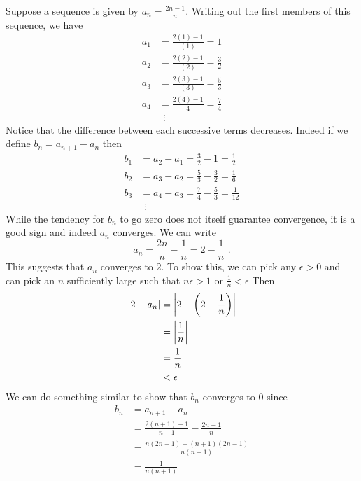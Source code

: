 \begin{example}
    Suppose a sequence is given by \( a_{n} = \frac{2n-1}{n} \). Writing out the first members of this sequence, we have 
    \begin{align*}
        a_{1} &= \frac{2(1)-1}{\left( 1 \right)} = 1 \\
        a_{2} &= \frac{2(2)-1}{(2)} = \frac{3}{2} \\
        a_{3} &= \frac{2(3)-1}{(3)} = \frac{5}{3} \\
        a_{4} &= \frac{2(4)-1}{4} = \frac{7}{4} \\
        & \ \ \vdots
    \end{align*}
    Notice that the difference between each successive terms decreases. Indeed if we define \( b_{n} = a_{n+1} -a_{n}\) then 
    \begin{align*}
        b_{1} &= a_{2}- a_{1} = \frac{3}{2}-1 = \frac{1}{2} \\
        b_{2} &= a_{3} - a_{2} = \frac{5}{3} - \frac{3}{2} = \frac{1}{6} \\
        b_{3} &= a_{4} - a_{3} = \frac{7}{4} - \frac{5}{3} = \frac{1}{12} \\\
        &\ \ \vdots
    \end{align*}
    While the tendency for \( b_{n} \) to go zero does not itself guarantee convergence, it is a good sign and indeed \( a_{n} \) converges. We can write 
    \[ a_{n} = \frac{2n}{n} - \frac{1}{n} = 2 - \frac{1}{n} \text{ .}\]
    This suggests that \( a_{n} \) converges to \( 2 \). To show this, we can pick any \( \epsilon >0 \) and can pick an \( n \) sufficiently large such that \( n \epsilon > 1 \) or \( \frac{1}{n} < \epsilon \) Then 
    \begin{align*}
        \abs{2 - a_{n}} &= \abs{ 2 - \left( 2- \frac{1}{n} \right)} \\\
        &= \abs{\frac{1}{n}} \\
        &= \frac{1}{n } \\
        &< \epsilon
    \end{align*}
    We can do something similar to show that \( b_{n} \) converges to \( 0 \) since 
    \begin{align*}
        b_{n} &= a_{n+1} - a_{n} \\
        &= \frac{2 (n+1) -1}{n+1} - \frac{2n -1}{n} \\
        &= \frac{n \left( 2n+1  \right) - \left( n+1  \right)(2n-1)}{n(n+1)} \\
        &= \frac{1}{n(n+1)}
    \end{align*}

\end{example}
